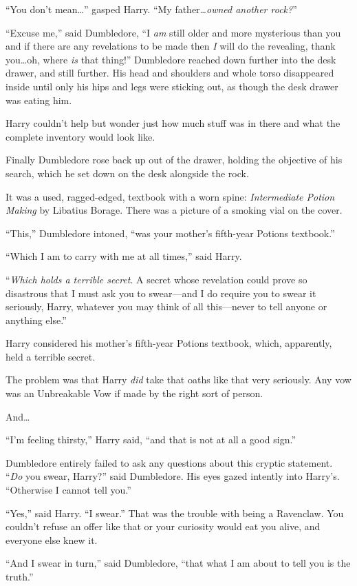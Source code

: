 “You don’t mean…” gasped Harry. “My father…\emph{owned another rock?}”

“Excuse me,” said Dumbledore, “I \emph{am} still older and more mysterious than you and if there are any revelations to be made then \emph{I} will do the revealing, thank you…oh, where \emph{is} that thing!” Dumbledore reached down further into the desk drawer, and still further. His head and shoulders and whole torso disappeared inside until only his hips and legs were sticking out, as though the desk drawer was eating him.

Harry couldn’t help but wonder just how much stuff was in there and what the complete inventory would look like.

Finally Dumbledore rose back up out of the drawer, holding the objective of his search, which he set down on the desk alongside the rock.

It was a used, ragged-edged, textbook with a worn spine: \emph{Intermediate Potion Making} by Libatius Borage. There was a picture of a smoking vial on the cover.

“This,” Dumbledore intoned, “was your mother’s fifth-year Potions textbook.”

“Which I am to carry with me at all times,” said Harry.

“\emph{Which holds a terrible secret}. A secret whose revelation could prove so disastrous that I must ask you to swear—and I do require you to swear it seriously, Harry, whatever you may think of all this—never to tell anyone or anything else.”

Harry considered his mother’s fifth-year Potions textbook, which, apparently, held a terrible secret.

The problem was that Harry \emph{did} take that oaths like that very seriously. Any vow was an Unbreakable Vow if made by the right sort of person.

And…

“I’m feeling thirsty,” Harry said, “and that is not at all a good sign.”

Dumbledore entirely failed to ask any questions about this cryptic statement. “\emph{Do} you swear, Harry?” said Dumbledore. His eyes gazed intently into Harry’s. “Otherwise I cannot tell you.”

“Yes,” said Harry. “I swear.” That was the trouble with being a Ravenclaw. You couldn’t refuse an offer like that or your curiosity would eat you alive, and everyone else knew it.

“And I swear in turn,” said Dumbledore, “that what I am about to tell you is the truth.”

